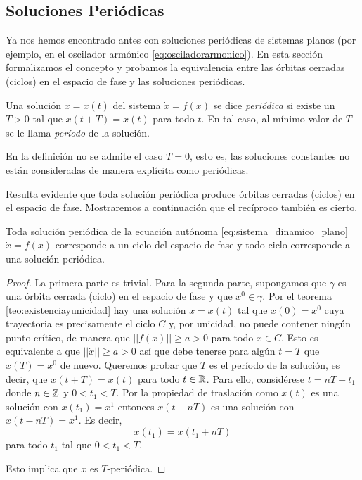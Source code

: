 \subsection{Soluciones Periódicas}

Ya nos hemos encontrado antes con soluciones periódicas de sistemas planos (por ejemplo, en el oscilador armónico \ref{eq:osciladorarmonico}). En esta sección formalizamos el concepto y probamos la equivalencia entre las órbitas cerradas (ciclos) en el espacio de fase y las soluciones periódicas.

\begin{definition} Una solución $x = x(t)$ del sistema $\dot{x} = f(x)$ se dice \emph{periódica} si existe un $T > 0$ tal que $x(t+T) = x(t)$ para todo $t$. En tal caso, al mínimo valor de $T$ se le llama \textit{período} de la solución.
\end{definition}

En la definición no se admite el caso $T=0$, esto es, las soluciones constantes no están consideradas de manera explícita como periódicas.

Resulta evidente que toda solución periódica produce órbitas cerradas (ciclos) en el espacio de fase. Mostraremos a continuación que el recíproco también es cierto.

\begin{lemma}
Toda solución periódica de la ecuación autónoma \ref{eq:sistema_dinamico_plano} $\dot{x} = f(x)$ corresponde a un ciclo del espacio de fase y todo ciclo corresponde a una solución periódica.
\end{lemma}
\begin{proof}
La primera parte es trivial. Para la segunda parte, supongamos que $\gamma$ es una órbita cerrada (ciclo) en el espacio de fase y que $x^0 \in \gamma$.
Por el teorema \ref{teo:existenciayunicidad} hay una solución $x = x(t)$ tal que $x(0) = x^0$ cuya trayectoria es precisamente el ciclo $C$ y, por unicidad, no puede contener ningún punto crítico, de manera que $|| f(x) || \geq a > 0$ para todo $x \in C$.
Esto es equivalente a que $|| \dot{x} || \geq a > 0$ así que debe tenerse para algún $t = T$ que $x(T) = x^0$ de nuevo. Queremos probar que $T$ es el período de la solución, es decir, que $x(t+T) = x(t)$ para todo $t \in {\ensuremath{\mathbb{R}}}$. Para ello, considérese $t = nT + t_1$ donde $n \in {\ensuremath{\mathbb{Z}}}$ y $0 < t_1 < T$. Por la propiedad de traslación como $x(t)$ es una solución con $x(t_1) = x^1$ entonces $x(t - nT)$ es una solución con $x(t - nT) = x^1$. Es decir, $$ x(t_1) = x(t_1 + nT)$$ para todo $t_1$ tal que $0 < t_1 < T$.

Esto implica que $x$ es $T$-periódica.
\end{proof}

